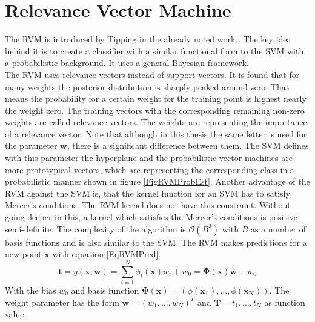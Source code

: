 \section{Relevance Vector Machine}\label{PcSecRVM}
The \ac{RVM} is introduced by Tipping in the already noted work \cite{Tipping.2001}.
The key idea behind it is to create a classifier with a similar functional form to the \ac{SVM} with a probabilistic background. 
It uses a general Bayesian framework.\\
The \acs{RVM} uses relevance vectors instead of support vectors.
It is found that for many weights the posterior distribution is sharply peaked around zero.
That means the probability for a certain weight for the training point is highest nearly the weight zero.
The training vectors with the corresponding remaining non-zero weights are called relevance vectors.
The weights are representing the importance of a relevance vector.\cite[p. 213]{Tipping.2001}
Note that although in this thesis the same letter is used for the parameter $\mathbf{w}$, there is a significant difference between them.
The \acs{SVM} defines with this parameter the hyperplane and the probabilistic vector machines are more prototypical vectors, which are representing the corresponding class in a probabilistic manner shown in figure \ref{FigRVMProbEst}.\cite[p. 222]{Tipping.2001}\newline
Another advantage of the \acs{RVM} against the \acs{SVM} is, that the kernel function for an \acs{SVM} has to satisfy Mercer's conditions.
The \ac{RVM} kernel does not have this constraint.\cite[p. 213]{Tipping.2001}\newline
Without going deeper in this, a kernel which satisfies the Mercer's conditions is positive semi-definite.\cite{Graepel.2002}
The complexity of the algorithm is $\mathcal{O}(B^3)$ with $B$ as a number of basis functions and is also similar to the \ac{SVM}.\cite[p. 236-237]{Tipping.2001}\newline
The \ac{RVM} makes predictions for a new point $\mathbf{x}$ with equation \ref{EqRVMPred}.\cite[p. 211]{Tipping.2001}
\begin{equation}\label{EqRVMPred}
\mathbf{t} = y(\mathbf{x};\mathbf{w}) = \sum_{i=1}^{N}\phi_i(\mathbf{x})w_i + w_0 = \boldsymbol{\Phi}(\mathbf{x})\mathbf{w} + w_0
\end{equation}
With the bias $w_0$ and basis function $\boldsymbol{\Phi}(\mathbf{x}) = (\phi(\mathbf{x_1}),\dots,\phi(\mathbf{x_N}))$.
The weight parameter has the form $\mathbf{w} = (w_1,\dots,w_N)^T$ and $\mathbf{T}={t_1,\dots,t_N}$ as function value.\\
